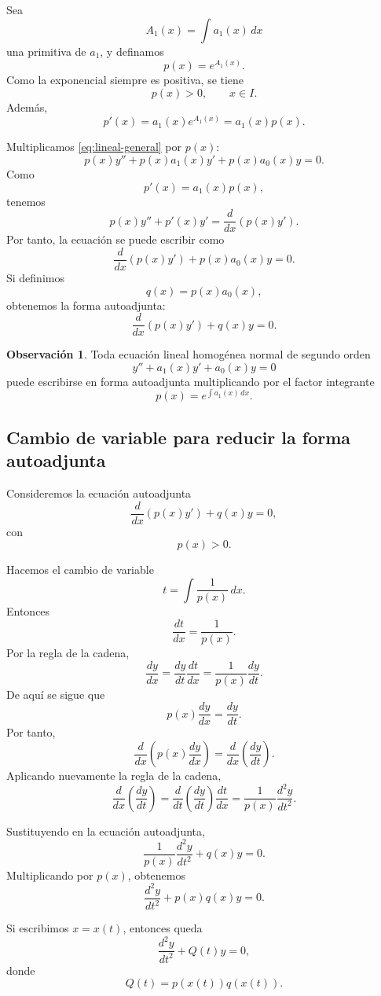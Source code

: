 \documentclass[12pt,a4paper]{article}
\theoremstyle{definition}
\newtheorem{observacion}[teorema]{Observación}
\begin{document}
Sea
\[
A_1(x)=\int a_1(x)\,dx
\]
una primitiva de \(a_1\), y definamos
\[
p(x)=e^{A_1(x)}.
\]
Como la exponencial siempre es positiva, se tiene
\[
p(x)>0,\qquad x\in I.
\]
Además,
\[
p'(x)=a_1(x)e^{A_1(x)}=a_1(x)p(x).
\]

Multiplicamos \eqref{eq:lineal-general} por \(p(x)\):
\[
p(x)y''+p(x)a_1(x)y'+p(x)a_0(x)y=0.
\]
Como
\[
p'(x)=a_1(x)p(x),
\]
tenemos
\[
p(x)y''+p'(x)y'=\frac{d}{dx}\left(p(x)y'\right).
\]
Por tanto, la ecuación se puede escribir como
\[
\frac{d}{dx}\left(p(x)y'\right)+p(x)a_0(x)y=0.
\]
Si definimos
\[
q(x)=p(x)a_0(x),
\]
obtenemos la forma autoadjunta:
\begin{equation}\label{eq:autoadjunta}
\frac{d}{dx}\left(p(x)y'\right)+q(x)y=0.
\end{equation}

\begin{observacion}
Toda ecuación lineal homogénea normal de segundo orden
\[
y''+a_1(x)y'+a_0(x)y=0
\]
puede escribirse en forma autoadjunta multiplicando por el factor integrante
\[
p(x)=e^{\int a_1(x)\,dx}.
\]
\end{observacion}

\subsection{Cambio de variable para reducir la forma autoadjunta}

Consideremos la ecuación autoadjunta
\[
\frac{d}{dx}\left(p(x)y'\right)+q(x)y=0,
\]
con
\[
p(x)>0.
\]

Hacemos el cambio de variable
\[
t=\int \frac{1}{p(x)}\,dx.
\]
Entonces
\[
\frac{dt}{dx}=\frac{1}{p(x)}.
\]
Por la regla de la cadena,
\[
\frac{dy}{dx}
=
\frac{dy}{dt}\frac{dt}{dx}
=
\frac{1}{p(x)}\frac{dy}{dt}.
\]
De aquí se sigue que
\[
p(x)\frac{dy}{dx}
=
\frac{dy}{dt}.
\]
Por tanto,
\[
\frac{d}{dx}\left(p(x)\frac{dy}{dx}\right)
=
\frac{d}{dx}\left(\frac{dy}{dt}\right).
\]
Aplicando nuevamente la regla de la cadena,
\[
\frac{d}{dx}\left(\frac{dy}{dt}\right)
=
\frac{d}{dt}\left(\frac{dy}{dt}\right)\frac{dt}{dx}
=
\frac{1}{p(x)}\frac{d^2y}{dt^2}.
\]

Sustituyendo en la ecuación autoadjunta,
\[
\frac{1}{p(x)}\frac{d^2y}{dt^2}+q(x)y=0.
\]
Multiplicando por \(p(x)\), obtenemos
\[
\frac{d^2y}{dt^2}+p(x)q(x)y=0.
\]

Si escribimos \(x=x(t)\), entonces queda
\begin{equation}\label{eq:reducida-autoadjunta}
\frac{d^2y}{dt^2}+Q(t)y=0,
\end{equation}
donde
\[
Q(t)=p(x(t))q(x(t)).
\]
\end{document}
